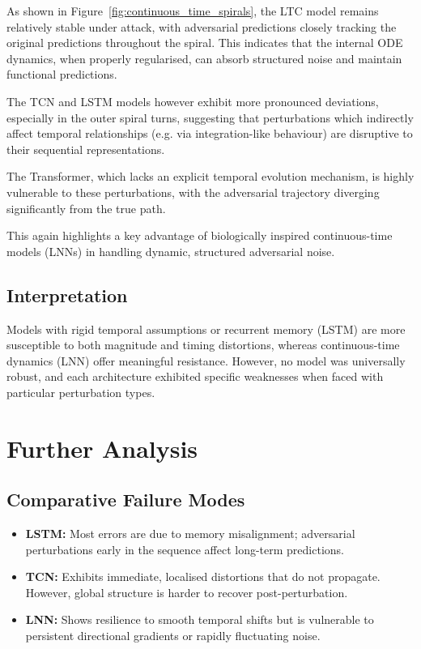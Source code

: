 As shown in Figure~\ref{fig:continuous_time_spirals}, the LTC model remains relatively stable under attack, with adversarial predictions closely tracking the original predictions throughout the spiral. This indicates that the internal ODE dynamics, when properly regularised, can absorb structured noise and maintain functional predictions.

The TCN and LSTM models however exhibit more pronounced deviations, especially in the outer spiral turns, suggesting that perturbations which indirectly affect temporal relationships (e.g. via integration-like behaviour) are disruptive to their sequential representations.

The Transformer, which lacks an explicit temporal evolution mechanism, is highly vulnerable to these perturbations, with the adversarial trajectory diverging significantly from the true path.

This again highlights a key advantage of biologically inspired continuous-time models (LNNs) in handling dynamic, structured adversarial noise.

\subsection*{Interpretation}

Models with rigid temporal assumptions or recurrent memory (LSTM) are more susceptible to both magnitude and timing distortions, whereas continuous-time dynamics (LNN) offer meaningful resistance. However, no model was universally robust, and each architecture exhibited specific weaknesses when faced with particular perturbation types.

\section{Further Analysis}

\subsection*{Comparative Failure Modes}

\begin{itemize}
    \item \textbf{LSTM:} Most errors are due to memory misalignment; adversarial perturbations early in the sequence affect long-term predictions.
    \item \textbf{TCN:} Exhibits immediate, localised distortions that do not propagate. However, global structure is harder to recover post-perturbation.
    \item \textbf{LNN:} Shows resilience to smooth temporal shifts but is vulnerable to persistent directional gradients or rapidly fluctuating noise.
\end{itemize}

